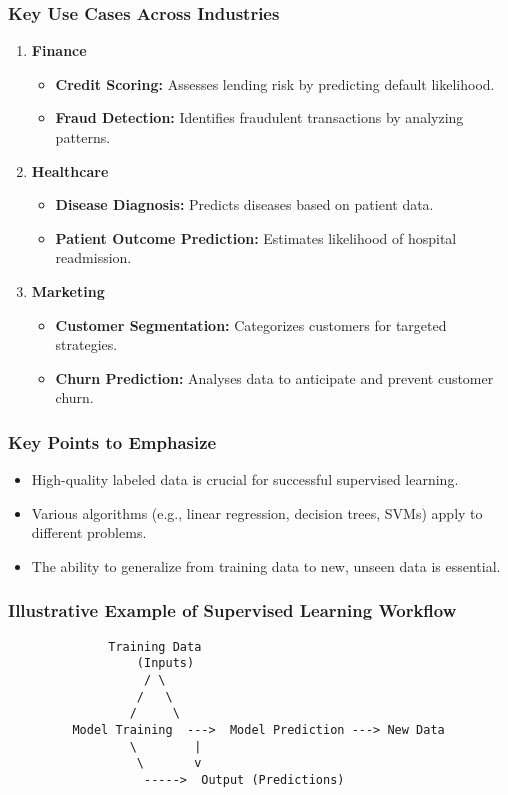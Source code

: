 \documentclass[aspectratio=169]{beamer}
\begin{document}
\begin{frame}
    \frametitle{Key Use Cases Across Industries}
    \begin{enumerate}
        \item \textbf{Finance}
            \begin{itemize}
                \item \textbf{Credit Scoring:} Assesses lending risk by predicting default likelihood.
                \item \textbf{Fraud Detection:} Identifies fraudulent transactions by analyzing patterns.
            \end{itemize}
        \item \textbf{Healthcare}
            \begin{itemize}
                \item \textbf{Disease Diagnosis:} Predicts diseases based on patient data.
                \item \textbf{Patient Outcome Prediction:} Estimates likelihood of hospital readmission.
            \end{itemize}
        \item \textbf{Marketing}
            \begin{itemize}
                \item \textbf{Customer Segmentation:} Categorizes customers for targeted strategies.
                \item \textbf{Churn Prediction:} Analyses data to anticipate and prevent customer churn.
            \end{itemize}
    \end{enumerate}
\end{frame}

\begin{frame}
    \frametitle{Key Points to Emphasize}
    \begin{itemize}
        \item High-quality labeled data is crucial for successful supervised learning.
        \item Various algorithms (e.g., linear regression, decision trees, SVMs) apply to different problems.
        \item The ability to generalize from training data to new, unseen data is essential.
    \end{itemize}
\end{frame}

\begin{frame}[fragile]
    \frametitle{Illustrative Example of Supervised Learning Workflow}
    \begin{center}
        \begin{verbatim}
              Training Data
                  (Inputs)
                   / \
                  /   \
                 /     \
         Model Training  --->  Model Prediction ---> New Data
                 \        |
                  \       v
                   ----->  Output (Predictions)
        \end{verbatim}
    \end{center}
\end{frame}
\end{document}
